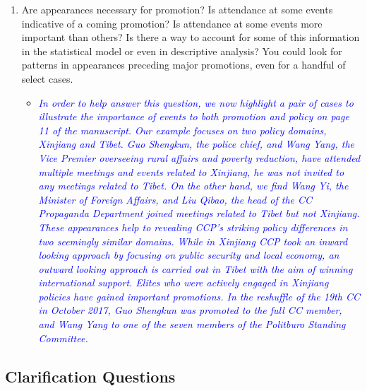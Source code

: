 \begin{enumerate}
\begin{itemize}
{{		}}
	\end{itemize}
	\item Are appearances necessary for promotion? Is attendance at some events indicative of a coming promotion? Is attendance at some events more important than others? Is there a way to account for some of this information in the statistical model or even in descriptive analysis? You could look for patterns in appearances preceding major promotions, even for a handful of select cases.
	\begin{itemize}
		\item \textcolor{blue}{ \emph{
			In order to help answer this question, we now highlight  a pair of cases to illustrate the importance of events to both promotion and policy on page 11 of the manuscript.  %
			Our example focuses on two policy domains, Xinjiang and Tibet.  Guo Shengkun, the police chief, and Wang Yang, the Vice Premier overseeing rural affairs and poverty reduction, have attended multiple meetings and events related to Xinjiang, he was not invited to any meetings related to Tibet.   On the other hand, we find Wang Yi, the Minister of Foreign Affairs, and Liu Qibao, the head of the CC Propaganda Department joined meetings related to Tibet but not Xinjiang.  These appearances help to revealing CCP’s striking policy differences in two seemingly similar domains.  While in Xinjiang CCP took an inward looking approach by focusing on public security and local economy, an outward looking approach is carried out in Tibet with the aim of winning international support.  Elites who were actively engaged in Xinjiang policies have gained important promotions.  In the reshuffle of the 19th CC in October 2017, Guo Shengkun was promoted to the full CC member, and Wang Yang to one of the seven members of the Politburo Standing Committee.
		}}
	\end{itemize}
\end{enumerate}

\subsection*{Clarification Questions}

